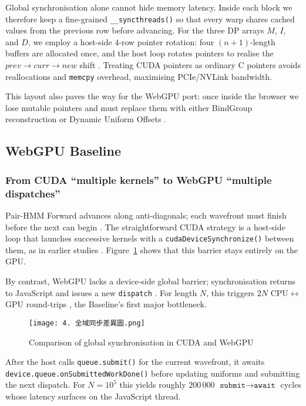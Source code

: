 \documentclass[PhD]{PHlab-thesis}
\begin{document}
Global synchronisation alone cannot hide memory latency. Inside each block we therefore keep a fine-grained \texttt{\_\_syncthreads()} so that every warp shares cached values from the previous row before advancing. For the three DP arrays $M$, $I$, and $D$, we employ a host-side $4$-row pointer rotation: four $(n+1)$-length buffers are allocated once, and the host loop rotates pointers to realise the $\textit{prev}\!\rightarrow\!\textit{curr}\!\rightarrow\!\textit{new}$ shift \cite{LiuWirawan2013}. Treating CUDA pointers as ordinary C pointers avoids reallocations and \texttt{memcpy} overhead, maximising PCIe/NVLink bandwidth.

This layout also paves the way for the WebGPU port: once inside the browser we lose mutable pointers and must replace them with either BindGroup reconstruction or Dynamic Uniform Offsets \cite{Chrome2024-blog}.



\subsection{WebGPU Baseline}

\subsubsection{From CUDA “multiple kernels” to WebGPU “multiple dispatches”}
Pair-HMM Forward advances along anti-diagonals; each wavefront must finish before the next can begin \cite{Durbin1998}. The straightforward CUDA strategy is a host-side loop that launches successive kernels with a \texttt{cudaDeviceSynchronize()} between them, as in earlier studies \cite{Banerjee2017,Schmidt2024-gpuPairHMM}. Figure~\ref{fig:global-sync-diff} shows that this barrier stays entirely on the GPU.

By contrast, WebGPU lacks a device-side global barrier; synchronisation returns to JavaScript and issues a new \texttt{dispatch} \cite{W3C2024-webgpu}. For length $N$, this triggers $2N$ CPU$\leftrightarrow$GPU round-trips \cite{Chrome2024-blog}, the Baseline's first major bottleneck.

\begin{figure}[htbp]
    \centering
    \texttt{[image: 4. 全域同步差異圖.png]}
    \caption{Comparison of global synchronisation in CUDA and WebGPU}
    \label{fig:global-sync-diff}
\end{figure}

After the host calls \texttt{queue.submit()} for the current wavefront, it awaits \texttt{device.queue.onSubmittedWorkDone()} before updating uniforms and submitting the next dispatch. For $N=10^{5}$ this yields roughly $200\,000$ \(\texttt{submit}\!\rightarrow\!\texttt{await}\) cycles whose latency surfaces on the JavaScript thread.
\end{document}
